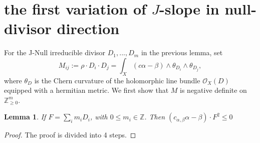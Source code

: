 \documentclass[reqno]{amsart}
\theoremstyle{remark}
\def\Z{\mathbb{Z}}
\def\cO{{\mathcal O}}
\theoremstyle{plain}
\newtheorem{lemma}[thm]{Lemma}
\begin{document}
\section{the first variation of $J$-slope in null-divisor direction}
For the J-Null irreducible divisor $D_1,...,D_m$ in the previous lemma, set \[M_{ij}:=\rho\cdot D_i\cdot D_j=\int_X(c\alpha-\beta)\wedge \theta_{D_i}\wedge\theta_{D_j},\]
where $\theta_D$ is the Chern curvature of the holomorphic line bundle $\cO_X(D)$ equipped with a hermitian metric. 
We first show that $M$ is negative definite on $\Z_{\geq 0}^m$.
\begin{lemma}\label{lem:seminegative-M}
    If $F=\sum_{i}m_iD_i$, with $0\leq m_i\in \Z$. Then $(c_{\alpha,\beta}\alpha-\beta)\cdot F^2\leq 0$
\end{lemma}
\begin{proof}
    The proof is divided into 4 steps. 
    

\end{proof}
\end{document}
